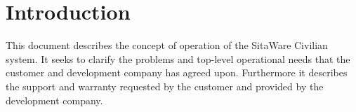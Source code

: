 \chapter{Introduction}
This document describes the concept of operation of the SitaWare Civilian system. It seeks to clarify the problems and top-level operational needs that the customer and development company has agreed upon. Furthermore it describes the support and warranty requested by the customer and provided by the development company. 

